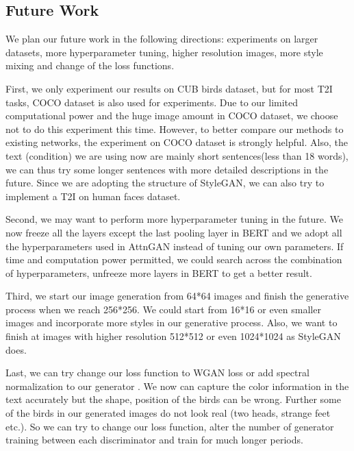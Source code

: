 \documentclass{article}
\begin{document}
\subsection{Future Work}
 
We plan our future work in the following directions: experiments on larger datasets, more hyperparameter tuning, higher resolution images, more style mixing and change of the loss functions.

First, we only experiment our results on CUB birds dataset, but for most T2I tasks, COCO dataset \cite{coco} is also used for experiments. Due to our limited computational power and the huge image amount in COCO dataset, we choose not to do this experiment this time. However, to better compare our methods to existing networks, the experiment on COCO dataset is strongly helpful. Also, the text (condition) we are using now are mainly short sentences(less than 18 words), we can thus try some longer sentences with more detailed descriptions in the future. Since we are adopting the structure of StyleGAN, we can also try to implement a T2I on human faces dataset.

Second, we may want to perform more hyperparameter tuning in the future. We now freeze all the layers except the last pooling layer in BERT and we adopt all the hyperparameters used in AttnGAN instead of tuning our own parameters. If time and computation power permitted, we could search across the combination of hyperparameters, unfreeze more layers in BERT to get a better result.

Third, we start our image generation from 64*64 images and finish the generative process when we reach 256*256. We could start from 16*16 or even smaller images and incorporate more styles in our generative process. Also, we want to finish at images with higher resolution 512*512 or even 1024*1024 as StyleGAN does.

Last, we can try change our loss function to WGAN loss\cite{wgan} or add spectral normalization to our generator \cite{sagan}. We now can capture the color information in the text accurately but the shape, position of the birds can be wrong. Further some of the birds in our generated images do not look real (two heads, strange feet etc.). So we can try to change our loss function, alter the number of generator training between each discriminator and train for much longer periods.

\newpage

\nocite{langley00}
\end{document}
